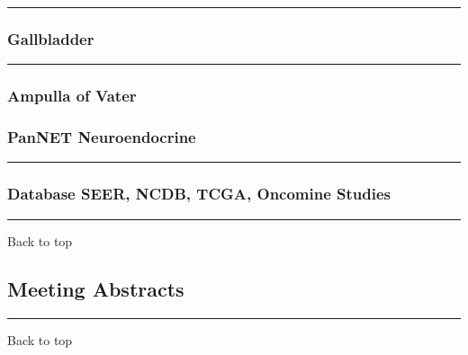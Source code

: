 \documentclass[]{article}
\begin{document}
\begin{center}\rule{0.5\linewidth}{\linethickness}\end{center}

\hypertarget{gallbladder-3}{%
\subsubsection{Gallbladder}\label{gallbladder-3}}

\begin{center}\rule{0.5\linewidth}{\linethickness}\end{center}

\hypertarget{ampulla-of-vater-3}{%
\subsubsection{Ampulla of Vater}\label{ampulla-of-vater-3}}

\hypertarget{pannet-neuroendocrine-3}{%
\subsubsection{PanNET Neuroendocrine}\label{pannet-neuroendocrine-3}}

\begin{center}\rule{0.5\linewidth}{\linethickness}\end{center}

\hypertarget{database-seer-ncdb-tcga-oncomine-studies}{%
\subsubsection{Database SEER, NCDB, TCGA, Oncomine
Studies}\label{database-seer-ncdb-tcga-oncomine-studies}}

\begin{center}\rule{0.5\linewidth}{\linethickness}\end{center}

Back to top

\pagebreak

\hypertarget{meeting-abstracts}{%
\subsection{Meeting Abstracts}\label{meeting-abstracts}}

\begin{center}\rule{0.5\linewidth}{\linethickness}\end{center}

Back to top
\end{document}

